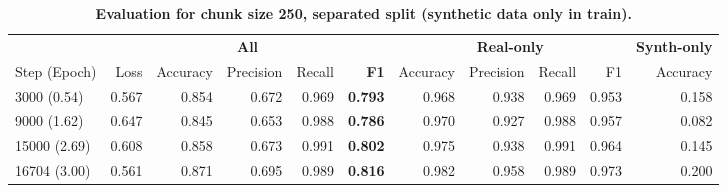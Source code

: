 \begin{table}[H]
\centering
\small
\caption[Evaluation for Chunk Size 250, Separated Split]{\textbf{Evaluation for chunk size 250, separated split (synthetic data only in train).}}
\label{tab:250_separated}
\begin{tabular}{@{}l *{10}{r} @{}}
\toprule
  & \multicolumn{5}{c}{\textbf{All}} 
  & \multicolumn{4}{c}{\textbf{Real-only}} 
  & \multicolumn{1}{c}{\textbf{Synth-only}}  \\
\cmidrule(lr){2-6} \cmidrule(lr){7-10} \cmidrule(lr){11-11} 
Step (Epoch) & Loss & Accuracy & Precision & Recall & \textbf{F1}
& Accuracy & Precision & Recall & F1
& Accuracy \\
\midrule
3000 (0.54)  & 0.567 & 0.854 & 0.672 & 0.969 & \textbf{0.793} & 0.968 & 0.938 & 0.969 & 0.953 & 0.158 \\
9000 (1.62)  & 0.647 & 0.845 & 0.653 & 0.988 & \textbf{0.786} & 0.970 & 0.927 & 0.988 & 0.957 & 0.082 \\
15000 (2.69) & 0.608 & 0.858 & 0.673 & 0.991 & \textbf{0.802} & 0.975 & 0.938 & 0.991 & 0.964 & 0.145 \\
16704 (3.00) & 0.561 & 0.871 & 0.695 & 0.989 & \textbf{0.816} & 0.982 & 0.958 & 0.989 & 0.973 & 0.200 \\
\bottomrule
\end{tabular}
\end{table}

